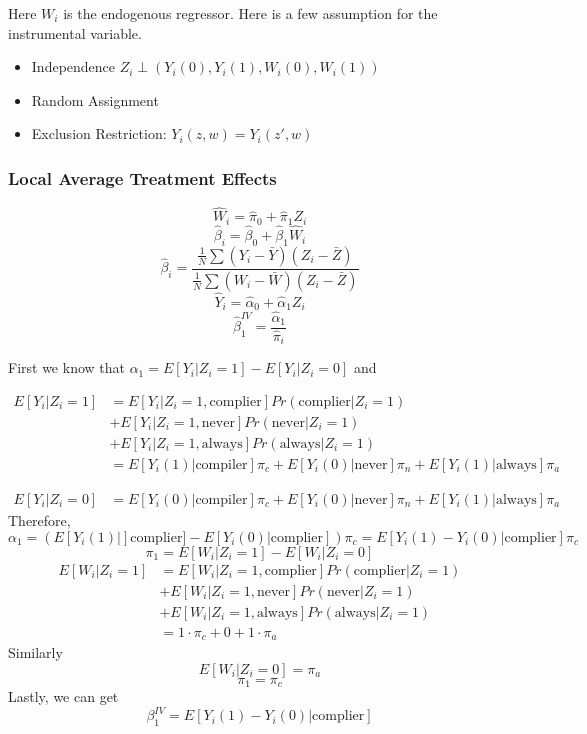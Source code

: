 \documentclass[11pt, a4paper, oneside]{article}
\theoremstyle{definition}
\theoremstyle{proposition}
\theoremstyle{corollary}
\theoremstyle{lemma}
\theoremstyle{theorem}
\begin{document}
Here $W_i$ is the endogenous regressor. Here is a few assumption for the instrumental variable.
\begin{itemize}
\item Independence $Z_i\perp(Y_i(0), Y_i(1), W_i(0), W_i(1))$
\item Random Assignment
\item Exclusion Restriction: $Y_i(z, w) = Y_i(z', w)$
\end{itemize}

\subsubsection{Local Average Treatment Effects}
$$\hat{W}_i = \hat{\pi}_0 + \hat{\pi}_1 Z_i$$
$$\hat{\beta}_i = \hat{\beta}_0 + \hat{\beta}_1\hat{W}_i$$
$$\hat{\beta}_i = \frac{\frac{1}{N}\sum (Y_i - \bar{Y})(Z_i - \bar{Z})}{\frac{1}{N}\sum (W_i - \bar{W})(Z_i - \bar{Z})}$$
$$\hat{Y}_i = \hat{\alpha}_0 + \hat{\alpha}_1 Z_i$$
$$\hat{\beta}_1^{IV} = \frac{\hat{\alpha}_1}{\hat{\pi}_i}$$

First we know that $\alpha_1 = E[Y_i|Z_i =1] - E[Y_i|Z_i=0]$ and 

\begin{align*}
E[Y_i|Z_i=1] &= E[Y_i|Z_i =1, \text{complier}]Pr(\text{complier}|Z_i =1) \\
&+ E[Y_i|Z_i=1, \text{never}]Pr(\text{never}|Z_i=1)\\
&+E[Y_i|Z_i=1, \text{always}]Pr(\text{always}|Z_i=1)\\
 &=E[Y_i(1)|\text{compiler}]\pi_c + E[Y_i(0)|\text{never}]\pi_n + E[Y_i(1)|\text{always}]\pi_a
\end{align*}

\begin{align*}
E[Y_i|Z_i=0] &=E[Y_i(0)|\text{compiler}]\pi_c + E[Y_i(0)|\text{never}]\pi_n + E[Y_i(1)|\text{always}]\pi_a
\end{align*}
Therefore, 
$$\alpha_1 = (E[Y_i(1)|]\text{complier}] - E[Y_i(0)|\text{complier}])\pi_c= E[Y_i(1)-Y_i(0)|\text{complier}]\pi_c$$
$$\pi_1 =E[W_i|Z_i=1]-E[W_i|Z_i=0]$$
\begin{align*}
E[W_i|Z_i=1] &= E[W_i|Z_i=1, \text{complier}]Pr(\text{complier}|Z_i=1) \\
&+ E[W_i|Z_i=1, \text{never}]Pr(\text{never}|Z_i=1)\\
&+E[W_i|Z_i=1, \text{always}]Pr(\text{always}|Z_i=1)\\
&=1\cdot \pi_c + 0 + 1\cdot \pi_a
\end{align*}
Similarly
$$E[W_i|Z_i=0]= \pi_a$$
$$\pi_1 = \pi_c$$
Lastly, we can get
$$\beta^{IV}_1 = E[Y_i(1)-Y_i(0)|\text{complier}]$$
\end{document}
